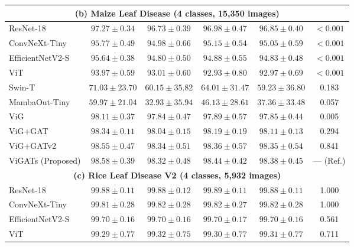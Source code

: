 \documentclass[]{interact}
\theoremstyle{plain}
\theoremstyle{definition}
\theoremstyle{remark}
\newcommand{\bestresult}[1]{\textcolor{bestgreen}{\textbf{#1}}}
\newcommand{\secondresult}[1]{\textcolor{secondorange}{#1}}
\begin{document}
{\begin{table}[H]
{\begin{tabular}{lccccc}
\midrule
\multicolumn{6}{c}{\textbf{(b) Maize Leaf Disease (4 classes, 15,350 images)}} \\ \midrule
ResNet-18 \citep{he2016deep} & $97.27 \pm 0.34$ & $96.73 \pm 0.39$ & $96.98 \pm 0.47$ & $96.85 \pm 0.40$ & $< 0.001$ \\
ConvNeXt-Tiny \citep{liu2022convnext} & $95.77 \pm 0.49$ & $94.98 \pm 0.66$ & $95.15 \pm 0.54$ & $95.05 \pm 0.59$ & $< 0.001$ \\
EfficientNetV2-S \citep{tan2021efficientnetv2} & $95.64 \pm 0.38$ & $94.80 \pm 0.50$ & $94.88 \pm 0.55$ & $94.83 \pm 0.48$ & $< 0.001$ \\
ViT \citep{dosovitskiy2020image} & $93.97 \pm 0.59$ & $93.01 \pm 0.60$ & $92.93 \pm 0.80$ & $92.97 \pm 0.69$ & $< 0.001$ \\
Swin-T \citep{liu2021swin} & $71.03 \pm 23.70$ & $60.15 \pm 35.82$ & $64.01 \pm 31.47$ & $59.23 \pm 36.80$ & 0.183 \\
MambaOut-Tiny \citep{yu2024mambaout} & $59.97 \pm 21.04$ & $32.93 \pm 35.94$ & $46.13 \pm 28.61$ & $37.36 \pm 33.48$ & 0.057 \\
ViG \citep{han2022vision} & $98.11 \pm 0.37$ & $97.84 \pm 0.47$ & $97.89 \pm 0.57$ & $97.85 \pm 0.44$ & 0.005 \\
ViG+GAT \citep{velickovic2018graph} & $98.34 \pm 0.11$ & $98.04 \pm 0.15$ & $98.19 \pm 0.19$ & $98.11 \pm 0.13$ & 0.294 \\
ViG+GATv2 \citep{brody2022gat} & \secondresult{$98.55 \pm 0.47$} & \bestresult{$98.34 \pm 0.51$} & \secondresult{$98.36 \pm 0.57$} & \secondresult{$98.35 \pm 0.54$} & 0.841 \\
ViGATs (Proposed) & \bestresult{$98.58 \pm 0.39$} & \secondresult{$98.32 \pm 0.48$} & \bestresult{$98.44 \pm 0.42$} & \bestresult{$98.38 \pm 0.45$} & --- (Ref.) \\
\midrule
\multicolumn{6}{c}{\textbf{(c) Rice Leaf Disease V2 (4 classes, 5,932 images)}} \\ \midrule
ResNet-18 \citep{he2016deep} & $99.88 \pm 0.11$ & $99.88 \pm 0.12$ & $99.89 \pm 0.11$ & $99.88 \pm 0.11$ & 1.000 \\
ConvNeXt-Tiny \citep{liu2022convnext} & $99.81 \pm 0.28$ & $99.82 \pm 0.28$ & $99.82 \pm 0.27$ & $99.82 \pm 0.28$ & 1.000 \\
EfficientNetV2-S \citep{tan2021efficientnetv2} & $99.70 \pm 0.16$ & $99.70 \pm 0.16$ & $99.70 \pm 0.17$ & $99.70 \pm 0.16$ & 0.561 \\
ViT \citep{dosovitskiy2020image} & $99.29 \pm 0.77$ & $99.32 \pm 0.75$ & $99.30 \pm 0.77$ & $99.31 \pm 0.77$ & 0.711 \\

\end{tabular}}
\end{table}}
\end{document}
